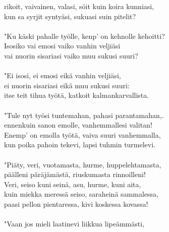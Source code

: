 rikoit, vaivainen, valasi, söit kuin koira kunniasi,                   \\
kun sa syrjit syntyäsi, sukuasi suin pitelit?                          \\
                                                                       \\
"Ku käski pahalle työlle, kenp' on kehnolle kehoitti?                  \\
Isosiko vai emosi vaiko vanhin veljiäsi                                \\
vai nuorin sisariasi vaiko muu sukusi suuri?                           \\
                                                                       \\
"Ei isosi, ei emosi eikä vanhin veljiäsi,                              \\
ei nuorin sisariasi eikä muu sukusi suuri:                             \\
itse teit tihua työtä, katkoit kalmankarvallista.                      \\
                                                                       \\
"Tule nyt työsi tuntemahan, pahasi parantamahan,.                      \\
ennenkuin sanon emolle, vanhemmallesi valitan!                         \\
Enemp' on emolla työtä, vaiva suuri vanhemmalla,                       \\
kun poika pahoin tekevi, lapsi tuhmin turmelevi.                       \\
                                                                       \\
"Piäty, veri, vuotamasta, hurme, huppelehtamasta,                      \\
päälleni päräjämästä, riuskumasta rinnoilleni!                         \\
Veri, seiso kuni seinä, asu, hurme, kuni aita,                         \\
kuin miekka meressä seiso, saraheinä sammalessa,                       \\
paasi pellon pientaressa, kivi koskessa kovassa!                       \\
                                                                       \\
"Vaan jos mieli laatinevi liikkua lipeämmästi,                         \\

